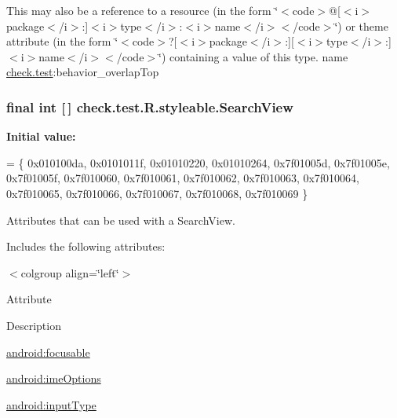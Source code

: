 This may also be a reference to a resource (in the form \char`\"{}$<$code$>$@\mbox{[}$<$i$>$package$<$/i$>$\+:\mbox{]}$<$i$>$type$<$/i$>$\+:$<$i$>$name$<$/i$>$$<$/code$>$\char`\"{}) or theme attribute (in the form \char`\"{}$<$code$>$?\mbox{[}$<$i$>$package$<$/i$>$\+:\mbox{]}\mbox{[}$<$i$>$type$<$/i$>$\+:\mbox{]}$<$i$>$name$<$/i$>$$<$/code$>$\char`\"{}) containing a value of this type.  name \hyperlink{namespacecheck_1_1test}{check.\+test}\+:behavior\+\_\+overlap\+Top \hypertarget{classcheck_1_1test_1_1_r_1_1styleable_af133609668e9a4263b21387e9a7574f8}{}
\subsubsection[{Search\+View}]{\setlength{\rightskip}{0pt plus 5cm}final int \mbox{[}$\,$\mbox{]} check.\+test.\+R.\+styleable.\+Search\+View\hspace{0.3cm}{\ttfamily [static]}}\label{classcheck_1_1test_1_1_r_1_1styleable_af133609668e9a4263b21387e9a7574f8}
{\bfseries Initial value\+:}
\begin{DoxyCode}
= \{
            0x010100da, 0x0101011f, 0x01010220, 0x01010264,
            0x7f01005d, 0x7f01005e, 0x7f01005f, 0x7f010060,
            0x7f010061, 0x7f010062, 0x7f010063, 0x7f010064,
            0x7f010065, 0x7f010066, 0x7f010067, 0x7f010068,
            0x7f010069
        \}
\end{DoxyCode}
Attributes that can be used with a Search\+View. 

Includes the following attributes\+:

\begin{TabularC}{0}
\hline
\end{TabularC}
$<$colgroup align=\char`\"{}left\char`\"{}$>$ 

Attribute

Description 

{\ttfamily \hyperlink{classcheck_1_1test_1_1_r_1_1styleable_a689e5c0ac8c31670b6e71cfaba9e2c0b}{android\+:focusable}}

{\ttfamily \hyperlink{classcheck_1_1test_1_1_r_1_1styleable_ac373b6a41705a4741ee109683c6b18fb}{android\+:ime\+Options}}

{\ttfamily \hyperlink{classcheck_1_1test_1_1_r_1_1styleable_a94590242dae34b9e05ef2e5e71613cb4}{android\+:input\+Type}}

